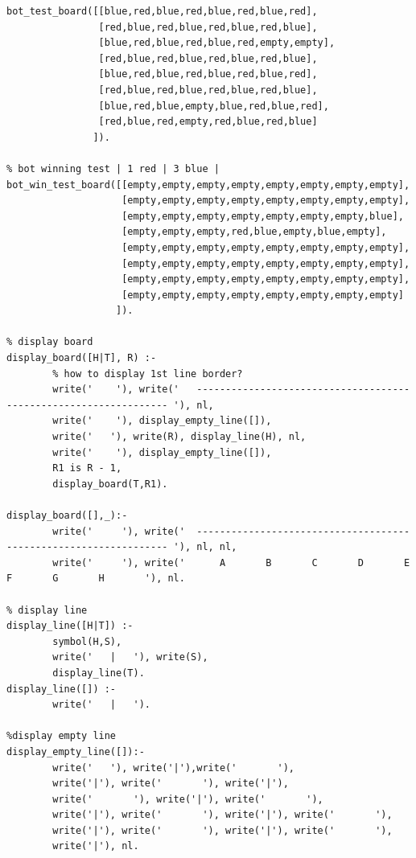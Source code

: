 \documentclass[a4paper]{article}
\begin{document}
\begin{lstlisting}[style=customprologwithlines]
bot_test_board([[blue,red,blue,red,blue,red,blue,red],
                [red,blue,red,blue,red,blue,red,blue],
                [blue,red,blue,red,blue,red,empty,empty],
                [red,blue,red,blue,red,blue,red,blue],
                [blue,red,blue,red,blue,red,blue,red],
                [red,blue,red,blue,red,blue,red,blue],
                [blue,red,blue,empty,blue,red,blue,red],
                [red,blue,red,empty,red,blue,red,blue]
               ]).

% bot winning test | 1 red | 3 blue |
bot_win_test_board([[empty,empty,empty,empty,empty,empty,empty,empty],
                    [empty,empty,empty,empty,empty,empty,empty,empty],
                    [empty,empty,empty,empty,empty,empty,empty,blue],
                    [empty,empty,empty,red,blue,empty,blue,empty],
                    [empty,empty,empty,empty,empty,empty,empty,empty],
                    [empty,empty,empty,empty,empty,empty,empty,empty],
                    [empty,empty,empty,empty,empty,empty,empty,empty],
                    [empty,empty,empty,empty,empty,empty,empty,empty]
                   ]).

% display board
display_board([H|T], R) :- 
        % how to display 1st line border?
        write('    '), write('   ----------------------------------------------------------------- '), nl,
        write('    '), display_empty_line([]),
        write('   '), write(R), display_line(H), nl,
        write('    '), display_empty_line([]),
        R1 is R - 1,
        display_board(T,R1).

display_board([],_):-
        write('     '), write('  ----------------------------------------------------------------- '), nl, nl,
        write('     '), write('      A       B       C       D       E       F       G       H       '), nl.

% display line
display_line([H|T]) :-
        symbol(H,S),
        write('   |   '), write(S), 
        display_line(T).
display_line([]) :-
        write('   |   ').

%display empty line
display_empty_line([]):-
        write('   '), write('|'),write('       '),
        write('|'), write('       '), write('|'),
        write('       '), write('|'), write('       '),
        write('|'), write('       '), write('|'), write('       '),
        write('|'), write('       '), write('|'), write('       '),
        write('|'), nl.
\end{lstlisting}
\end{document}
